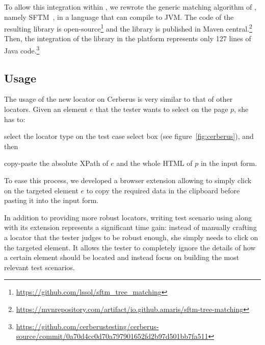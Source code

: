\documentclass[10pt,conference]{IEEEtran}
\begin{document}

To allow this integration within \cerberus, we rewrote the generic matching algorithm of \erratum, namely SFTM~\cite{brisset2020sftm}, in a language that can compile to JVM.
The code of the resulting library is open-source\footnote{\url{https://github.com/lssol/sftm\_tree\_matching}} and the library is published in Maven central.\footnote{\url{https://mvnrepository.com/artifact/io.github.amaris/sftm-tree-matching}}
Then, the integration of the \erratum library in the \cerberus platform represents only 127 lines of Java code.\footnote{\url{https://github.com/cerberustesting/cerberus-source/commit/0a70d4cc0d70a797901652fd2b97d501bb7fa511}}

\subsection{Usage}
The usage of the new \erratum locator on Cerberus is very similar to that of other locators.
Given an element $e$ that the tester wants to select on the page $p$, she has to:
\begin{compactenum}
\item select the \erratum locator type on the test case select box (see figure~\ref{fig:cerberus}), and then
\item copy-paste the absolute XPath of $e$ and the whole HTML of $p$ in the input form.
\end{compactenum}
To ease this process, we developed a browser extension allowing to simply click on the targeted element $e$ to copy the required data in the clipboard before pasting it into the input form.

In addition to providing more robust locators, writing test scenario using \erratum along with its extension represents a significant time gain: instead of manually crafting a locator that the tester judges to be robust enough, she simply needs to click on the targeted element. 
It allows the tester to completely ignore the details of how a certain element should be located and instead focus on building the most relevant test scenarios.
\end{document}
